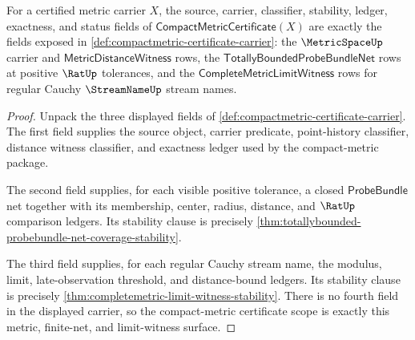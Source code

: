 \begin{theorem}
\label{thm:compactmetric-certificate-scope}
For a certified metric carrier $X$, the source, carrier, classifier,
stability, ledger, exactness, and status fields of
$\mathsf{CompactMetricCertificate}(X)$ are exactly the fields exposed in
\autoref{def:compactmetric-certificate-carrier}: the $\MetricSpaceUp$ carrier
and $\mathsf{MetricDistanceWitness}$ rows, the
$\mathsf{TotallyBoundedProbeBundleNet}$ rows at positive $\RatUp$ tolerances,
and the $\mathsf{CompleteMetricLimitWitness}$ rows for regular Cauchy
$\StreamNameUp$ stream names.
\end{theorem}
\begin{proof}
Unpack the three displayed fields of
\autoref{def:compactmetric-certificate-carrier}. The first field supplies the
source object, carrier predicate, point-history classifier, distance witness
classifier, and exactness ledger used by the compact-metric package.

The second field supplies, for each visible positive tolerance, a closed
$\mathsf{ProbeBundle}$ net together with its membership, center, radius,
distance, and $\RatUp$ comparison ledgers. Its stability clause is precisely
\autoref{thm:totallybounded-probebundle-net-coverage-stability}.

The third field supplies, for each regular Cauchy stream name, the modulus,
limit, late-observation threshold, and distance-bound ledgers. Its stability
clause is precisely \autoref{thm:completemetric-limit-witness-stability}.
There is no fourth field in the displayed carrier, so the compact-metric
certificate scope is exactly this metric, finite-net, and limit-witness
surface.
\end{proof}

